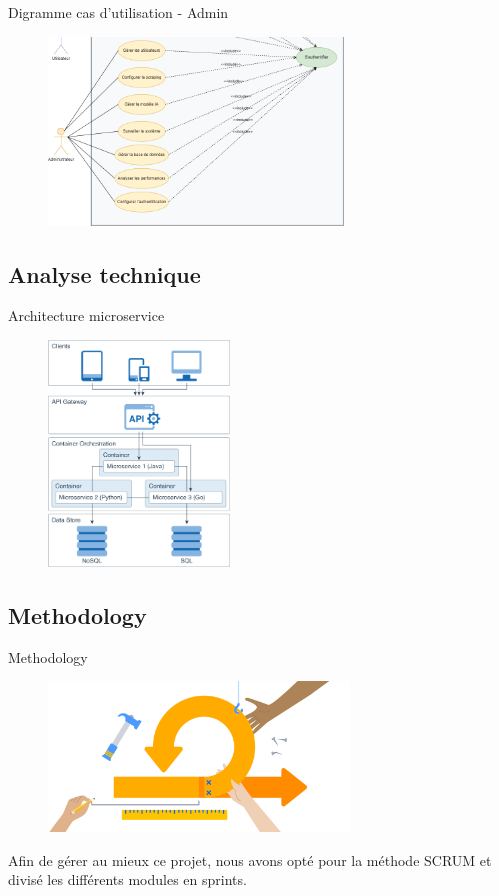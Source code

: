 \begin{frame}{Digramme cas d'utilisation - Admin}
    \begin{figure}[H]
        \centering
        \includegraphics[height=5cm]{assets/images/usecase-admin.png}
    \end{figure}
\end{frame}

\subsection{Analyse technique}

\begin{frame}{Architecture microservice}
    \begin{figure}[H]
        \centering
        \includegraphics[height=6cm]{assets/images/microservice_arch.png}
    \end{figure}
\end{frame}




\subsection{Methodology}
\begin{frame}{Methodology}

    \begin{figure}[H]
        \centering
        \includegraphics[height=4cm]{assets/images/scrum.png}
    \end{figure}

    Afin de gérer au mieux ce projet, nous avons opté pour la méthode SCRUM et divisé les différents modules en sprints.
\end{frame}


